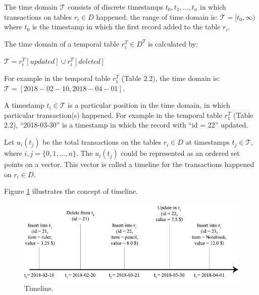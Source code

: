 \begin{defn}
	The time domain $\mathcal{T}$ consists of discrete timestamps $t_0,t_1,...,t_n$ in which transactions on tables $r_i \in D$ happened. the range of time domain is: $\mathcal{T} = [t_0, \infty)$ where $t_0$ is the timestamp in which the first record added to the table $r_i$.
\label{dfn:time_domain}
\end{defn}

The time domain of a temporal table $r_i^T \in D^T $ is calculated by:

\begin{center}
	$\mathcal{T} = r_i^T[updated] \cup r_i^T[deleted]$
\end{center}
For example in the temporal table $r_1^T$ (Table 2.2), the time domain is:
$\mathcal{T} = [2018-02-10,2018-04-01]$.
\begin{defn}[Timestamps]
	A timestamp $t_i \in \mathcal{T}$ is a particular position in the time domain, in which particular transaction(s) happened. For example in the temporal table $r_1^T$ (Table 2.2), ``2018-03-30'' is a timestamp in which the record with ``id = 22'' updated.
\label{dfn:timestamp}
\end{defn}
\begin{defn}[Timeline]
	Let $u_i(t_j)$ be the total transactions on the tables $r_i \in D$ at timestamps $t_j \in \mathcal{T}$, where $i,j=\{0,1,...,n\}$. The $u_i(t_j)$ could be represented as an ordered set points on a vector. This vector is called a timeline for the transactions happened on $r_i \in D$.
\label{dfn:timeline}
\end{defn}
Figure \ref{fig:timeline} illustrates the concept of timeline.

\begin{figure}
	\centering
	\includegraphics[width=\textwidth]{figs/timeline.pdf}
	\caption{Timeline.}
	\label{fig:timeline}
\end{figure}

